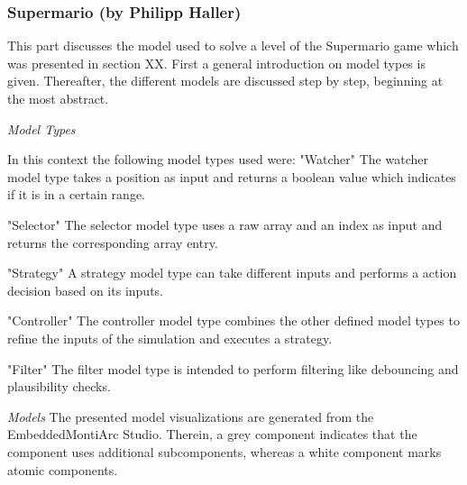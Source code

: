 \newpage
\subsubsection{Supermario (by Philipp Haller)}

This part discusses the model used to solve a level of the Supermario game which was presented in section XX. First a general introduction on model types is given. Thereafter, the different models are discussed step by step, beginning at the most abstract.

\emph{Model Types}

In this context the following model types used were:
"Watcher"
The watcher model type takes a position as input and returns a boolean value which indicates if it is in a certain range.

"Selector"
The selector model type uses a raw array and an index as input and returns the corresponding array entry.

"Strategy"
A strategy model type can take different inputs and performs a action decision based on its inputs.

"Controller"
The controller model type combines the other defined model types to refine the inputs of the simulation and executes a strategy.

"Filter"
The filter model type is intended to perform filtering like debouncing and plausibility checks.

\emph{Models}
The presented model visualizations are generated from the EmbeddedMontiArc Studio. Therein, a grey component indicates that the component uses additional subcomponents, whereas a white component marks atomic components. 

